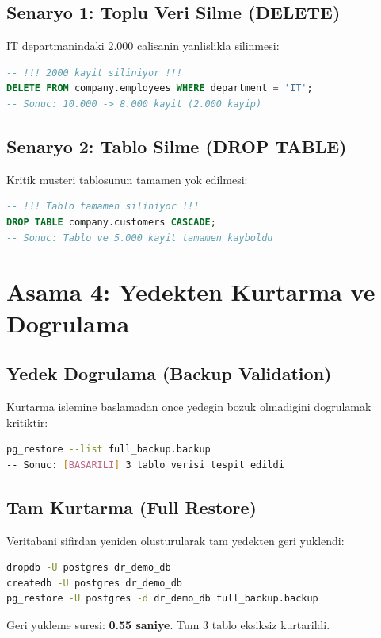\documentclass[12pt,a4paper]{article}
\begin{document}
\subsection{Senaryo 1: Toplu Veri Silme (DELETE)}
IT departmanindaki 2.000 calisanin yanlislikla silinmesi:
\begin{lstlisting}[language=SQL, caption=Felaket Senaryosu 1]
-- !!! 2000 kayit siliniyor !!!
DELETE FROM company.employees WHERE department = 'IT';
-- Sonuc: 10.000 -> 8.000 kayit (2.000 kayip)
\end{lstlisting}

\subsection{Senaryo 2: Tablo Silme (DROP TABLE)}
Kritik musteri tablosunun tamamen yok edilmesi:
\begin{lstlisting}[language=SQL, caption=Felaket Senaryosu 2]
-- !!! Tablo tamamen siliniyor !!!
DROP TABLE company.customers CASCADE;
-- Sonuc: Tablo ve 5.000 kayit tamamen kayboldu
\end{lstlisting}

\section{Asama 4: Yedekten Kurtarma ve Dogrulama}

\subsection{Yedek Dogrulama (Backup Validation)}
Kurtarma islemine baslamadan once yedegin bozuk olmadigini dogrulamak kritiktir:
\begin{lstlisting}[language=bash, caption=Yedek Butunluk Testi]
pg_restore --list full_backup.backup
-- Sonuc: [BASARILI] 3 tablo verisi tespit edildi
\end{lstlisting}

\subsection{Tam Kurtarma (Full Restore)}
Veritabani sifirdan yeniden olusturularak tam yedekten geri yuklendi:
\begin{lstlisting}[language=bash, caption=Full Restore]
dropdb -U postgres dr_demo_db
createdb -U postgres dr_demo_db
pg_restore -U postgres -d dr_demo_db full_backup.backup
\end{lstlisting}
Geri yukleme suresi: \textbf{0.55 saniye}. Tum 3 tablo eksiksiz kurtarildi.
\end{document}
